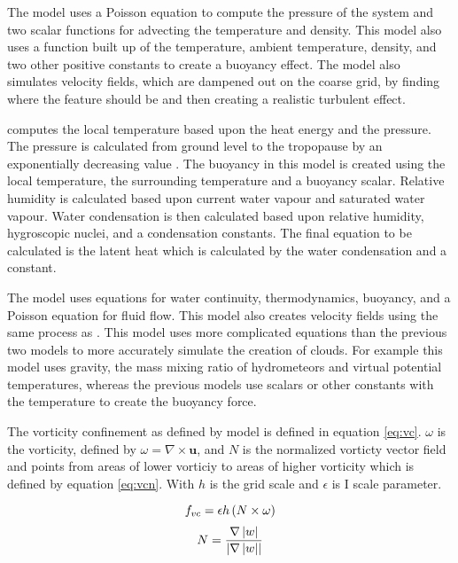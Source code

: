 The \citet*{Fedkiw01} model uses a Poisson equation to compute the pressure of the system and two scalar functions for advecting the temperature and density.
This model also uses a function built up of the temperature, ambient temperature, density, and two other positive constants to create a buoyancy effect.
The model also simulates velocity fields, which are dampened out on the coarse grid, by finding where the feature should be and then creating a realistic turbulent effect.

\citet*{DOverby02} computes the local temperature based upon the heat energy and the pressure.
The pressure is calculated from ground level to the tropopause by an exponentially decreasing value \citep*{DOverby02}.
The buoyancy in this model is created using the local temperature, the surrounding temperature and a buoyancy scalar.
Relative humidity is calculated based upon current water vapour and saturated water vapour.
Water condensation is then calculated based upon relative humidity, hygroscopic nuclei, and a condensation constants.
The final equation to be calculated is the latent heat which is calculated by the water condensation and a constant.
 
The \citet{HarrisEtAl03} model uses equations for water continuity, thermodynamics, buoyancy, and a Poisson equation for fluid flow.
This model also creates velocity fields using the same process as \citet*{Fedkiw01}.
This model uses more complicated equations than the previous two models to more accurately simulate the creation of clouds.
For example this model uses gravity, the mass mixing ratio of hydrometeors and virtual potential temperatures, whereas the previous models use scalars or other constants with the temperature to create the buoyancy force.

The vorticity confinement as defined by \citet{HarrisEtAl03} model is defined in equation \ref{eq:vc}.
$\omega$ is the vorticity, defined by $\omega = \nabla\times\mathbf{u}$, and $N$ is the normalized vorticty vector field and points from areas of lower vorticiy to areas of higher vorticity which is defined by equation \ref{eq:vcn}.
With $h$ is the grid scale and $\epsilon$ is I scale parameter.

\begin{equation} \label{eq:vc}
  \centering
  f_{vc} = \epsilon h\left(N\times\omega\right)
\end{equation}
\begin{equation} \label{eq:vcn}
  \centering
  N = \frac{\nabla\left|w\right|}{\left|\nabla\left|w\right|\right|}
\end{equation}

